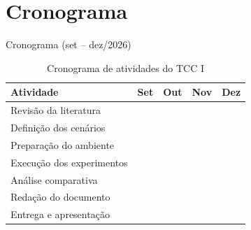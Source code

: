 

\section{Cronograma}
\label{sec:cronograma}

\begin{frame}{Cronograma (set -- dez/2026)}
    \begin{table}
        \caption*{Cronograma de atividades do TCC I}
        \centering
        \small
        \begin{tabular}{l c c c c} \hline
            \textbf{Atividade} & \textbf{Set} & \textbf{Out} & \textbf{Nov} & \textbf{Dez} \\ \hline
            Revisão da literatura        & \cellcolor{Lightblueframe} & \cellcolor{Lightblueframe} & & \\
            Definição dos cenários       & & \cellcolor{Lightblueframe} & & \\
            Preparação do ambiente       & & \cellcolor{Lightblueframe} & & \\
            Execução dos experimentos    & & & \cellcolor{Lightblueframe} & \\
            Análise comparativa          & & & \cellcolor{Lightblueframe} & \cellcolor{Lightblueframe} \\
            Redação do documento         & \cellcolor{Lightblueframe} & \cellcolor{Lightblueframe} & \cellcolor{Lightblueframe} & \cellcolor{Lightblueframe} \\
            Entrega e apresentação       & & & & \cellcolor{Lightblueframe} \\ \hline
        \end{tabular}
    \end{table}
\end{frame}

